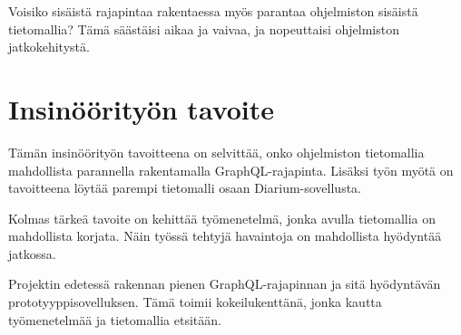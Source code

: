 Voisiko sisäistä rajapintaa rakentaessa myös parantaa ohjelmiston
sisäistä tietomallia? Tämä säästäisi aikaa ja vaivaa, ja nopeuttaisi
ohjelmiston jatkokehitystä.

\hypertarget{insinuxf6uxf6rityuxf6n-tavoite}{%
\section{Insinöörityön tavoite}\label{insinuxf6uxf6rityuxf6n-tavoite}}

Tämän insinöörityön tavoitteena on selvittää, onko ohjelmiston
tietomallia mahdollista parannella rakentamalla GraphQL-rajapinta.
Lisäksi työn myötä on tavoitteena löytää parempi tietomalli osaan
Diarium-sovellusta.

Kolmas tärkeä tavoite on kehittää työmenetelmä, jonka avulla tietomallia
on mahdollista korjata. Näin työssä tehtyjä havaintoja on mahdollista
hyödyntää jatkossa.

Projektin edetessä rakennan pienen GraphQL-rajapinnan ja sitä
hyödyntävän prototyyppisovelluksen. Tämä toimii kokeilukenttänä, jonka
kautta työmenetelmää ja tietomallia etsitään.
